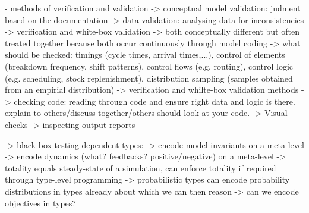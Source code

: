	- methods of verification and validation
	-> conceptual model validation: judment based on the documentation
	-> data validation: analysing data for inconsistencies
	-> verification and white-box validation
		-> both conceptually different but often treated together because both occur continuously through model coding
		-> what should be checked: timings (cycle times, arrival times,...), control of elements (breakdown frequency, shift patterns), control flows (e.g. routing), control logic (e.g. scheduling, stock replenishment), distribution sampling (samples obtained from an empirial distribution)
	-> verification and whilte-box validation methods
		-> checking code: reading through code and ensure right data and logic is there. explain to others/discuss together/others should look at your code. 
		-> Visual checks
		-> inspecting output reports
		
	-> black-box testing
dependent-types:
-> encode model-invariants on a meta-level
-> encode dynamics (what? feedbacks? positive/negative) on a meta-level
-> totality equals steady-state of a simulation, can enforce totality if required through type-level programming
-> probabilistic types can encode probability distributions in types already about which we can then reason
-> can we encode objectives in types?
